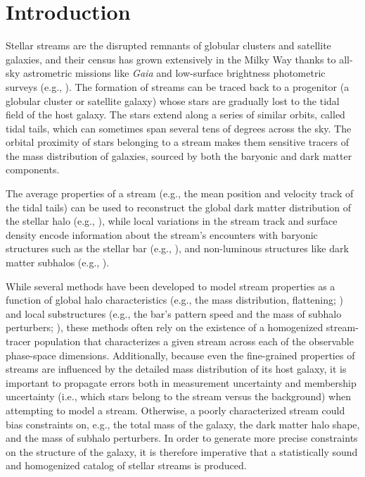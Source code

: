 \documentclass[twocolumn]{aastex631}
\newcommand{\dataarchive}[1]{\textit{#1}}
\newcommand{\Gaia}{\dataarchive{Gaia}}
\begin{document}
\section{Introduction} \label{sec:intro}

    Stellar streams are the disrupted remnants of globular clusters and
    satellite galaxies, and their census has grown extensively in the Milky Way
    thanks to all-sky astrometric missions like \Gaia{}
    \citep{GaiaCollaboration+2016, GaiaCollaboration+2023} and low-surface
    brightness photometric surveys (e.g., \citealt{Ibata+1998,
    GrillmairDionatos2006, Shipp+2018, Ibata+2021}).  The formation of streams
    can be traced back to a progenitor (a globular cluster or satellite galaxy)
    whose stars are gradually lost to the tidal field of the host galaxy. The
    stars extend along a series of similar orbits, called tidal tails, which can
    sometimes span several tens of degrees across the sky. The orbital proximity
    of stars belonging to a stream makes them sensitive tracers of the mass
    distribution of galaxies, sourced by both the baryonic and dark matter
    components.

    The average properties of a stream (e.g., the mean position and velocity
    track of the tidal tails) can be used to reconstruct the global dark matter
    distribution of the stellar halo (e.g., \citealt{Johnston+1999, Bonaca+2014,
    Bovy2014, Bovy+2016, Nibauer+2022, Koposov+2023}), while local variations in
    the stream track and surface density encode information about the stream's
    encounters with baryonic structures such as the stellar bar (e.g.,
    \citealt{Erkal+2017, Pearson+2017}), and non-luminous structures like dark
    matter subhalos (e.g., \citealt{Ibata+2002, Johnston+2002,
    Carlberg+2012-74820C, Bovy+2017, Bonaca+2019, Hermans+2021}).

    While several methods have been developed to model stream properties as a
    function of global halo characteristics (e.g., the mass distribution,
    flattening; \citealt{Johnston+1999,2008MNRAS.386L..47B,Koposov+2010,2013MNRAS.433.1826S,Bovy2014,Nibauer+2022}) and local substructures (e.g., the bar's pattern
    speed and the mass of subhalo perturbers; \citealt{2014A&A...563A..60A,Pearson+2017,2016MNRAS.460..497H,Bovy+2017,Bonaca+2019}), these methods often
    rely on the existence of a homogenized stream-tracer population that
    characterizes a given stream across each of the observable phase-space
    dimensions. Additionally, because even the fine-grained properties of
    streams are influenced by the detailed mass distribution of its host galaxy,
    it is important to propagate errors both in measurement uncertainty and
    membership uncertainty (i.e., which stars belong to the stream versus the
    background) when attempting to model a stream. Otherwise, a poorly
    characterized stream could bias constraints on, e.g., the total mass of the
    galaxy, the dark matter halo shape, and the mass of subhalo perturbers. In
    order to generate more precise constraints on the structure of the galaxy,
    it is therefore imperative that a statistically sound and homogenized
    catalog of stellar streams is produced. 
\end{document}

